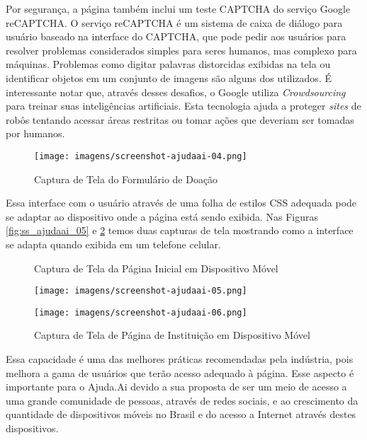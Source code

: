 Por segurança, a página também inclui um teste CAPTCHA do serviço Google reCAPTCHA. O serviço reCAPTCHA é um sistema de caixa de diálogo para usuário baseado na interface do CAPTCHA, que pode pedir aos usuários para resolver problemas considerados simples para seres humanos, mas complexo para máquinas. Problemas como digitar palavras distorcidas exibidas na tela ou identificar objetos em um conjunto de imagens são alguns dos utilizados. É interessante notar que, através desses desafios, o Google utiliza \emph{Crowdsourcing} para treinar suas inteligências artificiais. Esta tecnologia ajuda a proteger \emph{sites} de robôs tentando acessar áreas restritas ou tomar ações que deveriam ser tomadas por humanos\cite{wiki:ReCAPTCHA}.

\begin{figure}[H]
	\caption{\label{fig:ss_ajudaai_04}Captura de Tela do Formulário de Doação}
    \centering
    \texttt{[image: imagens/screenshot-ajudaai-04.png]}
\end{figure}

Essa interface com o usuário através de uma folha de estilos CSS adequada pode se adaptar ao dispositivo onde a página está sendo exibida. Nas Figuras \ref{fig:ss_ajudaai_05} e \ref{fig:ss_ajudaai_06} temos duas capturas de tela mostrando como a interface se adapta quando exibida em um telefone celular.

\begin{figure}[H]
 \centering
  \begin{minipage}{0.4\textwidth}
    \centering
    \caption{Captura de Tela da Página Inicial em Dispositivo Móvel}
    \label{fig:ss_ajudaai_05}
    \texttt{[image: imagens/screenshot-ajudaai-05.png]}
  \end{minipage}
  \hfill
  \begin{minipage}{0.4\textwidth}
    \centering
    \caption{Captura de Tela de Página de Instituição em Dispositivo Móvel}
    \label{fig:ss_ajudaai_06}
    \texttt{[image: imagens/screenshot-ajudaai-06.png]}
  \end{minipage}
\end{figure}

Essa capacidade é uma das melhores práticas recomendadas pela indústria, pois melhora a gama de usuários que terão acesso adequado à página. Esse aspecto é importante para o Ajuda.Ai devido a sua proposta de ser um meio de acesso a uma grande comunidade de pessoas, através de redes sociais, e ao crescimento da quantidade de dispositivos móveis no Brasil e do acesso a Internet através destes dispositivos.

